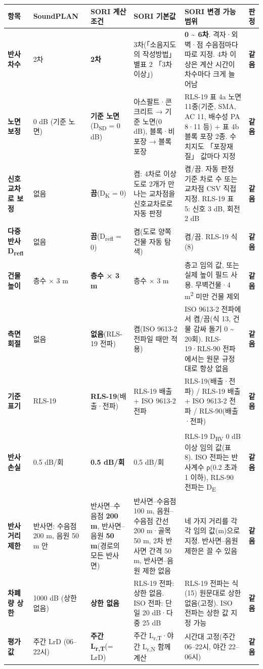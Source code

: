 \documentclass[10pt,a4paper]{article}
\newcommand{\hl}[1]{\textbf{#1}}
\newcommand{\ok}{\colorbox{okbg}{\textcolor{okfg}{\sffamily\bfseries\footnotesize 같음}}}
\begin{document}
{\footnotesize
\renewcommand{\arraystretch}{1.25}
\begin{tabularx}{\linewidth}{@{}>{\bfseries}P{19mm}P{22mm}P{28mm}P{30mm}Lc@{}}
\toprule
{} 항목 & SoundPLAN & SORI 계산 조건 & SORI 기본값 & SORI 변경 가능 범위 & 판정 \\
\midrule
반사 차수 & 2차 & \hl{2차} & 3차(「소음지도의 작성방법」 별표 2 「3차 이상」) &
  \hl{0 \textasciitilde{} 6차}. 격자·외벽·점 수음점마다 따로 지정. 4차 이상은 계산 시간이 차수마다 크게 늘어남 & \ok \\
노면 보정 & 0 dB (기준 노면) & \hl{기준 노면}(D\textsubscript{SD} = 0 dB) & 아스팔트·콘크리트 → 기준 노면(0 dB), 블록·비포장 → 블록 포장 &
  RLS-19 표 4a 노면 11종(기준, SMA, AC 11, 배수성 PA 8·11 등) + 표 4b 블록 포장 2종. 수치지도 「포장재질」 값마다 지정 & \ok \\
신호교차로 보정 & 없음 & \hl{끔}(D\textsubscript{K} = 0) & 켬: 4차로 이상 도로 2개가 만나는 교차점을 신호교차로로 자동 판정 &
  켬/끔. 자동 판정 기준 차로 수 또는 교차점 CSV 직접 지정. RLS-19 표 5: 신호 3 dB, 회전 2 dB & \ok \\
다중반사 D\textsubscript{refl} & 없음 & \hl{끔}(D\textsubscript{refl} = 0) & 켬(도로 양쪽 건물 자동 탐색) &
  켬/끔. RLS-19 식 (8) & \ok \\
건물 높이 & 층수 × 3 m & \hl{층수 × 3 m} & 층수 × 3 m &
  층고 임의 값, 또는 실제 높이 필드 사용. 무벽건물·4 m\textsuperscript{2} 미만 건물 제외 & \ok \\
측면 회절 & 없음 & \hl{없음}(RLS-19 전파) & 켬(ISO 9613-2 전파일 때만 적용) &
  ISO 9613-2 전파에서 켬/끔(식 13, 건물 감싸 돌기 0 \textasciitilde{} 20회). RLS-19·RLS-90 전파에서는 원문 규정대로 항상 없음 & \ok \\
기준 표기 & RLS-19 & \hl{RLS-19}(배출·전파) & RLS-19 배출 + ISO 9613-2 전파 &
  RLS-19(배출·전파) / RLS-19 배출 + ISO 9613-2 전파 / RLS-90(배출·전파) & \ok \\
\midrule
{} \\
\midrule
반사 손실 & 0.5 dB/회 & \hl{0.5 dB/회} & 0.5 dB/회 &
  RLS-19 D\textsubscript{RV} 0 dB 이상 임의 값(표 8). ISO 전파는 반사계수 ρ(0.2 초과 1 이하), RLS-90 전파는 D\textsubscript{E} & \ok \\
반사 거리 제한 & 반사면: 수음점 200 m, 음원 50 m 안 & 반사면–수음점 \hl{200 m}, 반사면–음원 \hl{50 m}(경로의 모든 반사면) &
  반사면–수음점 100 m, 음원–수음점 간선 200 m·골목 50 m, 2차 반사면 간격 50 m, 반사면–음원 제한 없음 &
  네 가지 거리를 각각 임의 값(m)으로 지정. 반사면–음원 제한은 끌 수 있음 & \ok \\
차폐량 상한 & 1000 dB (상한 없음) & \hl{상한 없음} & RLS-19 전파: 상한 없음. ISO 전파: 단일 20 dB·다중 25 dB &
  RLS-19 전파는 식 (15) 원문대로 상한 없음(고정). ISO 전파는 상한 값 지정 가능 & \ok \\
평가값 & 주간 LrD (06–22시) & \hl{주간 L\textsubscript{r,T}}(= LrD) & 주간 L\textsubscript{r,T}·야간 L\textsubscript{r,N} 함께 계산 &
  시간대 고정(주간 06–22시, 야간 22–06시) & \ok \\
\bottomrule
\end{tabularx}}
\end{document}
